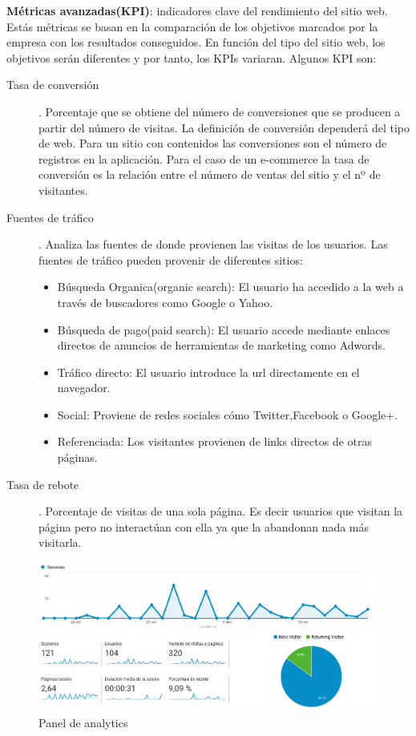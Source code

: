 \vspace{5 mm}

\textbf{Métricas avanzadas(KPI)}: indicadores clave del rendimiento del sitio web. Estás métricas se basan en la comparación de los objetivos marcados por la empresa con los resultados conseguidos. En función del tipo del sitio web, los objetivos serán diferentes y por tanto, los KPIs variaran. Algunos KPI son:

\begin{description}


\item [Tasa de conversión]. Porcentaje que se obtiene del número de conversiones que se producen a partir del número de visitas. La definición de conversión dependerá del tipo de web. Para un sitio con contenidos las conversiones son el número de registros en la aplicación. Para el caso de un e-commerce la tasa de conversión es la relación entre el número de ventas del sitio y el nº de visitantes.

\item [Fuentes de tráfico]. Analiza las fuentes de donde provienen las visitas de los usuarios. Las fuentes de tráfico pueden provenir de diferentes sitios:

\begin{itemize}
\item Búsqueda Organica(organic search): El usuario ha accedido a la web a través de buscadores como Google o Yahoo.
\item Búsqueda de pago(paid search): El usuario accede mediante enlaces directos de anuncios de herramientas de marketing como Adwords.
\item Tráfico directo: El usuario introduce la url directamente en el navegador.
\item Social: Proviene de redes sociales cómo Twitter,Facebook o Google+.
\item Referenciada: Los visitantes provienen de links directos de otras páginas.
\end{itemize}
 
\item [Tasa de rebote]. Porcentaje de visitas de una sola página. Es decir usuarios que visitan la página pero no interactúan con ella ya que la abandonan nada más visitarla.
\end{description}

\begin{figure}
\begin{center}
\includegraphics[width=1.0\textwidth]{imagenes/analytics.png}
\caption{Panel de analytics}
\label{analytics}
\end{center}
\end{figure}

